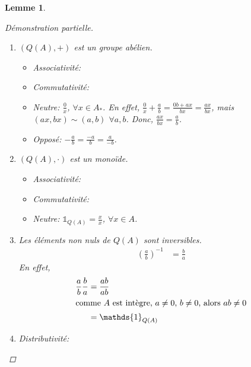 \documentclass{report}
\newtheorem*{lem}{Lemme}
\theoremstyle{definition}
\theoremstyle{remark}
\def\id{\mathds{1}}
\begin{document}
\begin{lem}
\begin{proof}[D\'emonstration partielle]
\begin{enumerate}
				De m\^eme, on peut montrer que $\frac{a}{b}\frac{c}{d} = \frac{a'}{b'}\frac{c'}{d'}$.
				\item $(Q(A),+)$ est un groupe ab\'elien.
				\begin{itemize}
					\item Associativit\'e: \checkmark
					\item Commutativit\'e: \checkmark
					\item Neutre: $\frac{0}{x}$, $\forall x\in A_*$. En effet, $\frac{0}{x}+\frac{a}{b} = \frac{0b+ax}{bx} = \frac{ax}{bx}$, mais $(ax,bx) \sim (a,b)$ $\forall a,b$. Donc, $\frac{ax}{bx}=\frac{a}{b}$.
					\item Oppos\'e: $-\frac{a}{b} = \frac{-a}{b} = \frac{a}{-b}$.
				\end{itemize}
				\item $(Q(A), \cdot)$ est un mono\"ide.
				\begin{itemize}
					\item Associativit\'e: \checkmark
					\item Commutativit\'e: \checkmark
					\item Neutre: $\id_{Q(A)}=\frac{x}{x}$, $\forall x\in A$.
				\end{itemize}
				\item Les \'el\'ements non nuls de $Q(A)$ sont inversibles.
				\begin{align*}
					\left(\frac{a}{b}\right)^{-1}&= \frac{b}{a}
				\end{align*}
				En effet,
				\begin{align*}
					\frac{a}{b}\frac{b}{a}&= \frac{ab}{ab}\\
					\shortintertext{comme $A$ est int\`egre, $a\neq0$, $b\neq0$, alors $ab\neq0$}
					&= \id_{Q(A)}
				\end{align*}
				\item Distributivit\'e: \checkmark
			\end{enumerate}
		\end{proof}
	\end{lem}
\end{document}
